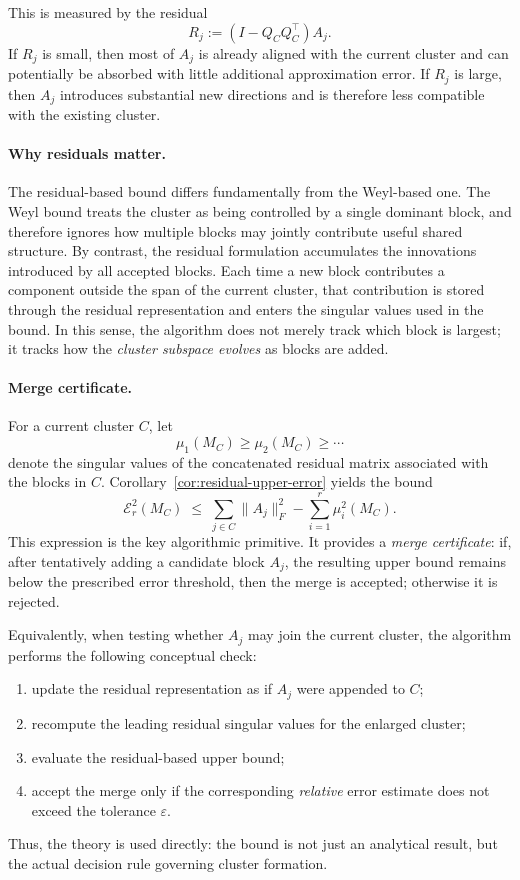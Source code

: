 \documentclass[10pt]{article} %
\begin{document}
This is measured by the residual
\[
  R_j := (I - Q_C Q_C^\top)A_j.
\]
If $R_j$ is small, then most of $A_j$ is already aligned with the current
cluster and can potentially be absorbed with little additional approximation
error. If $R_j$ is large, then $A_j$ introduces substantial new directions and
is therefore less compatible with the existing cluster.

\paragraph{Why residuals matter.}
The residual-based bound differs fundamentally from the Weyl-based one. The
Weyl bound treats the cluster as being controlled by a single dominant block,
and therefore ignores how multiple blocks may jointly contribute useful shared
structure. By contrast, the residual formulation accumulates the innovations
introduced by all accepted blocks. Each time a new block contributes a
component outside the span of the current cluster, that contribution is stored
through the residual representation and enters the singular values used in the
bound. In this sense, the algorithm does not merely track which block is
largest; it tracks how the \emph{cluster subspace evolves} as blocks are added.

\paragraph{Merge certificate.}
For a current cluster $C$, let
\[
  \mu_1(M_C)\ge \mu_2(M_C)\ge \cdots
\]
denote the singular values of the concatenated residual matrix associated with
the blocks in $C$. Corollary~\ref{cor:residual-upper-error} yields the bound
\[
  \mathcal{E}_r^2(M_C)
  \;\le\;
  \sum_{j\in C}\|A_j\|_F^2 - \sum_{i=1}^r \mu_i^2(M_C).
\]
This expression is the key algorithmic primitive. It provides a
\emph{merge certificate}: if, after tentatively adding a candidate block
$A_j$, the resulting upper bound remains below the prescribed error threshold,
then the merge is accepted; otherwise it is rejected.

Equivalently, when testing whether $A_j$ may join the current cluster, the
algorithm performs the following conceptual check:
\begin{enumerate}
  \item update the residual representation as if $A_j$ were appended to $C$;
  \item recompute the leading residual singular values for the enlarged
  cluster;
  \item evaluate the residual-based upper bound;
  \item accept the merge only if the corresponding \emph{relative} error
  estimate does not exceed the tolerance $\varepsilon$.
\end{enumerate}
Thus, the theory is used directly: the bound is not just an analytical result,
but the actual decision rule governing cluster formation.
\end{document}
